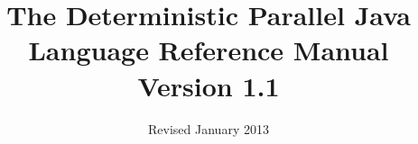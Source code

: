 \documentclass[10pt]{article}
\title{\bfseries{The Deterministic Parallel Java \\
Language Reference Manual \\
Version 1.1}}
\date{Revised January 2013}
\begin{document}
\maketitle

\tableofcontents{}

\begin{sloppypar}








\end{sloppypar}
\end{document}

